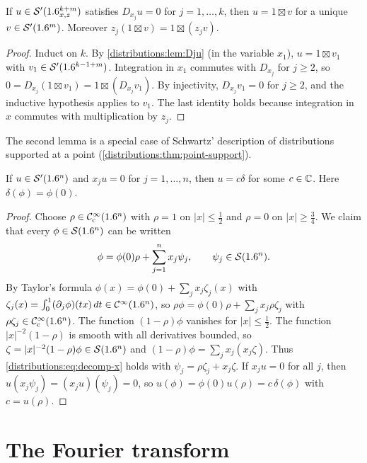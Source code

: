 \begin{corollary}\label{distributions:cor:Dju}
If $u\in\mathcal{S}'(1.6^{k+m}_{x,z})$ satisfies $D_{x_j}u=0$ for $j=1,\dots,k$, then
$u=1\boxtimes v$ for a unique $v\in\mathcal{S}'(1.6^m)$. Moreover
$z_j(1\boxtimes v)=1\boxtimes(z_jv)$.
\end{corollary}
\begin{proof}
Induct on $k$. By \cref{distributions:lem:Dju} (in the variable $x_1$),
$u=1\boxtimes v_1$ with $v_1\in\mathcal{S}'(1.6^{k-1+m})$. Integration in $x_1$ commutes with
$D_{x_j}$ for $j\ge2$, so $0=D_{x_j}(1\boxtimes v_1)=1\boxtimes(D_{x_j}v_1)$. By
injectivity, $D_{x_j}v_1=0$ for $j\ge2$, and the inductive hypothesis applies to
$v_1$. The last identity holds because integration in $x$ commutes with multiplication
by $z_j$.
\end{proof}

The second lemma is a special case of Schwartz' description of distributions supported
at a point (\cref{distributions:thm:point-support}).

\begin{lemma}\label{distributions:lem:xju}
If $u\in\mathcal{S}'(1.6^n)$ and $x_ju=0$ for $j=1,\dots,n$, then $u=c\delta$ for some
$c\in\mathbb{C}$. Here $\delta(\phi)=\phi(0)$.
\end{lemma}
\begin{proof}
Choose $\rho\in\mathcal{C}^\infty_{\mathrm{c}}(1.6^n)$ with $\rho=1$ on $|x|\le\frac12$ and $\rho=0$ on
$|x|\ge\frac34$. We claim that every $\phi\in\mathcal{S}(1.6^n)$ can be written
\begin{equation}\label{distributions:eq:decomp-x}
  \phi=\phi(0)\rho+\sum_{j=1}^nx_j\psi_j,\qquad\psi_j\in\mathcal{S}(1.6^n).
\end{equation}
By Taylor's formula $\phi(x)=\phi(0)+\sum_jx_j\zeta_j(x)$ with
$\zeta_j(x)=\int_0^1(\partial_j\phi)(tx)\,dt\in\mathcal{C}^\infty(1.6^n)$, so
$\rho\phi=\phi(0)\rho+\sum_jx_j\rho\zeta_j$ with $\rho\zeta_j\in\mathcal{C}^\infty_{\mathrm{c}}(1.6^n)$. The function
$(1-\rho)\phi$ vanishes for $|x|\le\frac12$. The function $|x|^{-2}(1-\rho)$ is smooth
with all derivatives bounded, so $\zeta=|x|^{-2}(1-\rho)\phi\in\mathcal{S}(1.6^n)$ and
$(1-\rho)\phi=\sum_jx_j(x_j\zeta)$. Thus \eqref{distributions:eq:decomp-x} holds with
$\psi_j=\rho\zeta_j+x_j\zeta$. If $x_ju=0$ for all $j$, then
$u(x_j\psi_j)=(x_ju)(\psi_j)=0$, so
$u(\phi)=\phi(0)u(\rho)=c\,\delta(\phi)$ with $c=u(\rho)$.
\end{proof}

\section{The Fourier transform}\label{distributions:sec:fourier}

